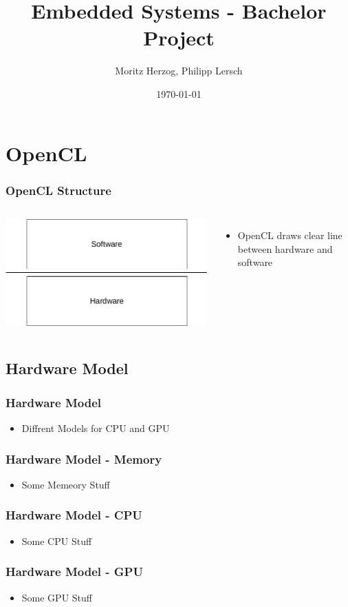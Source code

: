 \documentclass{beamer}
\title{Embedded Systems - Bachelor Project}
\author{Moritz Herzog, Philipp Lersch}
\date{\today}
\begin{document}
\maketitle


\section{OpenCL}
\begin{frame}
    \frametitle{OpenCL Structure}
    \begin{columns}
        \includegraphics[width=\textwidth]{res/HardwareSoftwareLayer.jpg}
        \begin{itemize}
            \item OpenCL draws clear line between hardware and software
            
        \end{itemize}
    \end{columns}
\end{frame}
\subsection{Hardware Model}
\begin{frame}
    \frametitle{Hardware Model}
    \begin{itemize}
     \item Diffrent Models for CPU and GPU
    \end{itemize}
\end{frame}
\begin{frame}
    \frametitle{Hardware Model - Memory}
    \begin{itemize}
     \item Some Memeory Stuff
    \end{itemize}
\end{frame}
\begin{frame}
    \frametitle{Hardware Model - CPU}
    \begin{itemize}
     \item Some CPU Stuff
    \end{itemize}
\end{frame}
\begin{frame}
    \frametitle{Hardware Model - GPU}
    \begin{itemize}
     \item Some GPU Stuff
    \end{itemize}
\end{frame}
\end{document}
